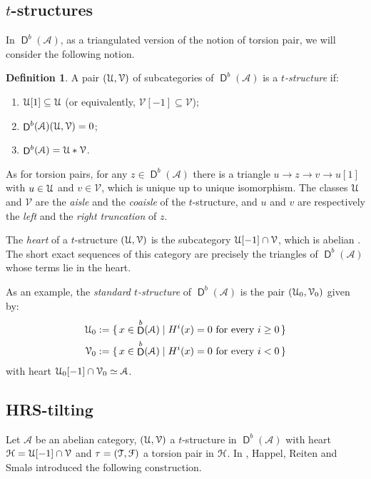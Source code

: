 \documentclass[a4paper,11pt]{amsart}
\theoremstyle{plain}
\theoremstyle{definition}
\newtheorem{dfn}[thm]{Definition}
\newcommand{\Acal}{\mathcal{A}} \newcommand{\Bcal}{\mathcal{B}} \newcommand{\Ccal}{\mathcal{C}}
\newcommand{\Vcal}{\mathcal{V}} \newcommand{\Wcal}{\mathcal{W}} \newcommand{\Xcal}{\mathcal{X}}
\DeclareMathOperator{\D}{\mathsf{D}}
\begin{document}
\subsection{$t$-structures}

In $\D^b(\Acal)$, as a triangulated version of the notion of torsion pair, we
will consider the following notion.

\begin{dfn}
	A pair $(\Ucal,\Vcal)$ of subcategories of $\D^b(\Acal)$ is a
	\emph{$t$-structure} if:
	\begin{enumerate}
		\item $\mathcal{U}[1]\subseteq\mathcal{U}$ (or equivalently, $\Vcal[-1]\subseteq\Vcal$);
		\item $\D^b(\Acal)(\Ucal,\Vcal)=0$;
		\item $\D^b(\Acal)=\Ucal\ast\Vcal$.
	\end{enumerate}
\end{dfn}

As for torsion pairs, for any $z\in\D^b(\Acal)$ there is a triangle $u\to z\to
v\to u[1]$ with $u\in\mathcal{U}$ and $v\in\Vcal$, which is unique up to unique isomorphism.
The classes $\mathcal{U}$ and $\Vcal$ are the \emph{aisle} and the \emph{coaisle} of
the $t$-structure, and $u$ and $v$ are respectively the \emph{left} and the
\emph{right truncation} of $z$.

The \emph{heart} of a $t$-structure $(\Ucal,\Vcal)$ is the subcategory
$\Ucal[-1]\cap\Vcal$, which is abelian \cite[Thm.~1.3.6]{bbd-81}. The short
exact sequences of this category are precisely the triangles of $\D^b(\Acal)$
whose terms lie in the heart.

As an example, the \emph{standard $t$-structure} of $\D^b(\Acal)$ is the pair
$(\Ucal_0,\Vcal_0)$ given by:
\begin{align*}
	\Ucal_0&:=\{\,x\in\D^b(\Acal) \mid H^i(x)=0 \text{ for every }i\geq 0\,\} \\
	\Vcal_0&:=\{\,x\in\D^b(\Acal)\mid H^i(x)=0 \text{ for every }i<0\,\}
\end{align*}
with heart $\Ucal_0[-1]\cap\Vcal_0\simeq \Acal$.

\subsection{HRS-tilting}\label{subsec:hrs-tilting}

Let $\Acal$ be an abelian category, $(\Ucal,\Vcal)$ a $t$-structure in
$\D^b(\Acal)$ with heart $\Hcal=\Ucal[-1]\cap\Vcal$ and $\tau=(\mathcal{T},\mathcal{F})$ a
torsion pair in $\mathcal{H}$. In \cite{happ-reit-smal-96}, Happel, Reiten and Smalø introduced the
following construction.
\end{document}
